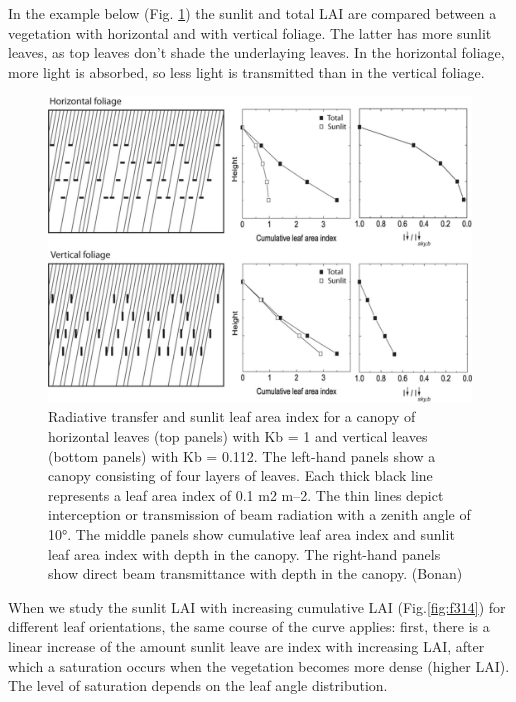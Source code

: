 \documentclass[12pt,oneside]{book}
\begin{document}
In the example below (Fig. \ref{fig:f313}) the sunlit and total LAI are
compared between a vegetation with horizontal and with vertical foliage.
The latter has more sunlit leaves, as top leaves don't shade the
underlaying leaves. In the horizontal foliage, more light is absorbed,
so less light is transmitted than in the vertical foliage.

\begin{figure}

{\centering \includegraphics[width=0.8\linewidth]{figures/chap3/f313_sun_shade} 

}

\caption{Radiative transfer and sunlit leaf area index for a canopy of horizontal leaves (top panels) with Kb = 1 and vertical leaves (bottom panels) with Kb = 0.112. The left-hand panels show a canopy consisting of four layers of leaves. Each thick black line represents a leaf area index of 0.1 m2 m–2. The thin lines depict interception or transmission of beam radiation with a zenith angle of 10°. The middle panels show cumulative leaf area index and sunlit leaf area index with depth in the canopy. The right-hand panels show direct beam transmittance with depth in the canopy. (Bonan)}\label{fig:f313}
\end{figure}

When we study the sunlit LAI with increasing cumulative LAI
(Fig.\ref{fig:f314}) for different leaf orientations, the same course of
the curve applies: first, there is a linear increase of the amount
sunlit leave are index with increasing LAI, after which a saturation
occurs when the vegetation becomes more dense (higher LAI). The level of
saturation depends on the leaf angle distribution.
\end{document}
